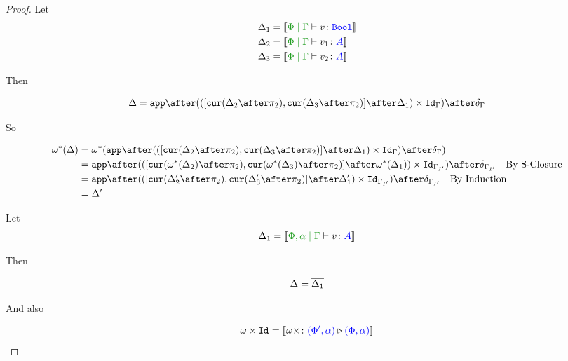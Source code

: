 \documentclass{report}
\begin{document}
\begin{framed}
\begin{proof}
        \case{\vif}
        
        Let \begin{align*}
            \D_1 &= \deno{\gpetyperelation{v}{\B}}\\
            \D_2 &= \deno{\gpetyperelation{v_1}{A}}\\
            \D_3 &= \deno{\gpetyperelation{v_2}{A}}\\
        \end{align*}
        
        Then
        
        \begin{equation}
            \D = \app\after(([\cur{\D_2\after\pp}, \cur{\D_3\after\pp}]\after\D_1)\times\Id{\G})\after\diag{\G}\\
        \end{equation}
        
        So
        
        \begin{align*}
            \w\star(\D) &= \w\star(\app\after(([\cur{\D_2\after\pp}, \cur{\D_3\after\pp}]\after\D_1)\times\Id{\G})\after\diag{\G})\\
            &= \app\after(([\cur{\w\star(\D_2)\after\pp}, \cur{\w\star(\D_3)\after\pp}]\after\w\star(\D_1))\times\Id{\G_{I'}})\after\diag{\G_{I'}}\qt{By S-Closure}\\
            &= \app\after(([\cur{\D_2'\after\pp}, \cur{\D_3'\after\pp}]\after\D_1')\times\Id{\G_{I'}})\after\diag{\G_{I'}}\qt{By Induction}\\
            & = \D'\\
        \end{align*}
        
        
        \case{\vgen}
        
        Let \begin{equation}
            \D_1 = \deno{\etyperelation{\P,\a}{\G}{v}{A}}
        \end{equation}
        
        Then
        
        \begin{equation}
            \Delta = \overline{\Delta_1}\\
        \end{equation}
        
        And also
        
        \begin{equation}
            \omega\times\texttt{Id}_{} = {\bf [\![}\omega\times \colon {\color{blue}(\Phi',\alpha)} \triangleright {\color {blue} (\Phi,\alpha)}{\bf ]\!]}
        \end{equation}
        

\end{proof}
\end{framed}
\end{document}

